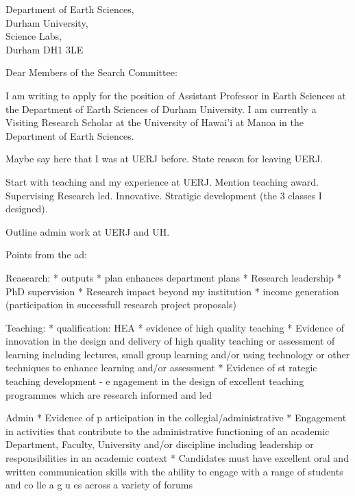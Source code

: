\documentclass[11pt]{letter}
\begin{document}
\begin{letter}{
        Department of Earth Sciences,  \\
        Durham University, \\
        Science Labs, \\
        Durham DH1 3LE
}
\opening{Dear Members of the Search Committee:}

I am writing to apply for the position of
Assistant Professor in Earth Sciences
at the Department of Earth Sciences of Durham University.
I am currently a Visiting Research Scholar at the University of Hawai'i at Manoa in the
Department of Earth Sciences.

Maybe say here that I was at UERJ before.
State reason for leaving UERJ.


Start with teaching and my experience at UERJ.
Mention teaching award.
Supervising
Research led.
Innovative.
Stratigic development (the 3 classes I designed).


Outline admin work at UERJ and UH.


Points from the ad:

Reasearch:
* outputs
* plan enhances department plans
* Research leadership
* PhD supervision
* Research impact beyond my institution
* income generation (participation in successfull research project proposals)

Teaching:
* qualification: HEA
* evidence of high quality teaching
* Evidence of innovation in the design and delivery of high quality teaching or assessment of learning including lectures, small group learning and/or using technology or other techniques to enhance learning and/or assessment
* Evidence of st rategic teaching development - e ngagement in the design of excellent teaching programmes which are research informed and led


Admin
* Evidence of p articipation in the collegial/administrative
* Engagement in activities that contribute to the administrative functioning of an academic Department, Faculty, University and/or discipline including leadership or responsibilities in an academic context
* Candidates must have excellent oral and written communication skills with the ability to engage with a range of students and co lle a g u es across a variety of forums








\end{letter}
\end{document}
